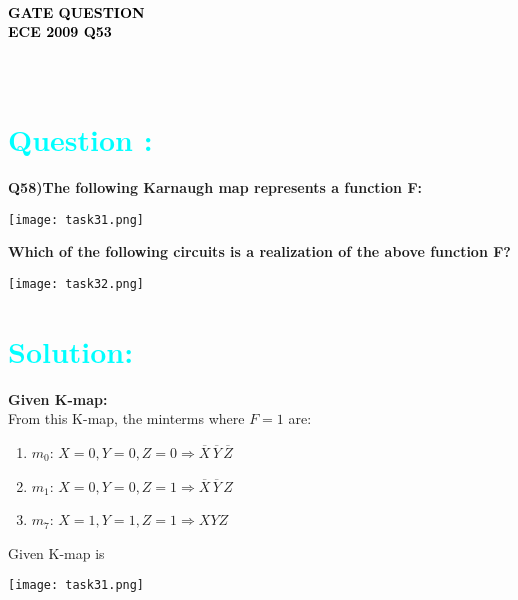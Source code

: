 \documentclass[a4paper,12pt]{article}
\begin{document}
\thispagestyle{fancy}
\fancyhf{} 
\renewcommand{\headrulewidth}{0pt} 

\vspace{1cm}
\begin{center}
    {\LARGE \textbf{\textcolor{black}{\\  GATE QUESTION \\ ECE 2009 Q53}}}
\end{center}
\vspace{-1cm}
\section*{\textcolor{cyan}{ \\Question :}}
\textbf{Q58)The following Karnaugh map represents a function F:} \\
\vspace{1em}
\begin{center}
\begin{minipage}[t]{0.38\textwidth}
\vspace{-3em}
\texttt{[image: task31.png]}

\end{minipage}
\end{center}
\vspace{0.5em}
\textbf{Which of the following circuits is a realization of the above function F?}
\begin{center}
\begin{minipage}[t]{1\textwidth}
\vspace{-1.5em}
\texttt{[image: task32.png]}

\end{minipage}
\end{center}
 \section*{\textcolor{cyan}{Solution:}}
 
\textbf{Given K-map:} \\
From this K-map, the minterms where \( F = 1 \) are:
\begin{enumerate}
    \item \( m_0 \): \( X = 0, Y = 0, Z = 0 \Rightarrow \overline{X} \, \overline{Y} \, \overline{Z} \)
    \item \( m_1 \): \( X = 0, Y = 0, Z = 1 \Rightarrow \overline{X} \, \overline{Y} \, Z \)
    \item \( m_7 \): \( X = 1, Y = 1, Z = 1 \Rightarrow X Y Z \) \\
\end{enumerate}
Given K-map is 
\begin{center}
\begin{minipage}[t]{0.38\textwidth}
\vspace{-3em}
\texttt{[image: task31.png]}
\end{minipage}
\end{center}
\end{document}
